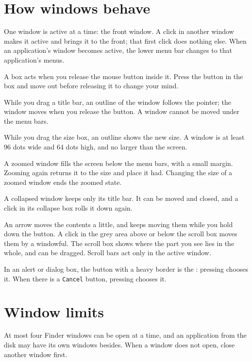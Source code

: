 \section{How windows behave}
One window is active at a time: the front
window.  A click in another window makes it active and brings it to the
front; that first click does nothing else.  When an application's window
becomes active, the lower menu bar changes to that application's menus.

A box acts when you release the mouse button inside it.
Press the button in the box and move out before releasing it to change your
mind.

While you drag a title bar, an outline of the window
follows the pointer; the window moves when you release the button.  A
window cannot be moved under the menu bars.

While you drag the size box, an outline shows the new size.
A window is at least 96 dots wide and 64 dots high, and no larger than the
screen.

A zoomed window fills the screen below the menu bars,
with a small margin.  Zooming again returns it to the size and place it
had.  Changing the size of a zoomed window ends the zoomed state.

A collapsed window keeps only its title bar.  It can
be moved and closed, and a click in its collapse box rolls it down again.

An arrow moves the contents a little, and keeps
moving them while you hold down the button.  A click in the grey area
above or below the scroll box moves them by a windowful.  The scroll box
shows where the part you see lies in the whole, and can be dragged.
Scroll bars act only in the active window.

In an alert or dialog box, the button with a heavy
border is the : pressing  chooses it.  When
there is a \texttt{Cancel} button, pressing  chooses it.

\section{Window limits}
At most four Finder windows can be open at a time, and an application from
the disk may have its own windows besides.  When a window does not open,
close another window first.
